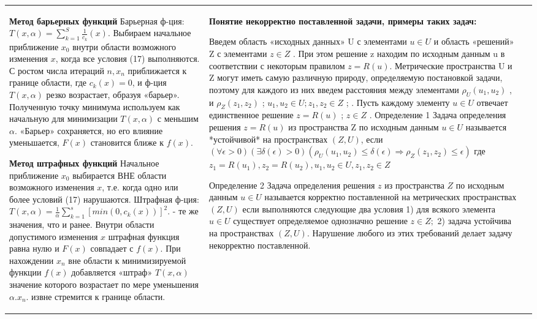 \documentclass[a4paper,2pt]{article}
\begin{document}
\begin{tabular}{|p{}|p{}|p{}|}
\textbf{Метод барьерных функций}
Барьерная ф-ция: \(T(x, \alpha) = \sum_{k=1}^{S}\frac{1}{c_{k}}(x)  \tag{19}\).
Выбираем начальное приближение \(x_{0}\) внутри области возможного изменения \(x\), когда все условия (17) выполняются. С ростом числа итераций \(n, x_{n}\) приближается к границе области, где \(c_{k}(x)=0\), и ф-ция \(T(x, \alpha)\) резко возрастает, образуя «барьер». Полученную точку минимума используем как начальную для минимизации \(T(x, \alpha)\) с меньшим \(\alpha\). «Барьер» сохраняется, но его влияние уменьшается, \(F(x)\) становится ближе к \(f(x)\).

\textbf{Метод штрафных функций}
Начальное приближение \(x_{0}\) выбирается ВНЕ области возможного изменения \(x\), т.е. когда одно или более условий (17) нарушаются. Штрафная ф-ция: \(T(x, \alpha) = \frac{1}{\alpha} \sum_{k=1}^{s}[min(0, c_{k}(x))]^2\). - те же значения, что и ранее. Внутри области допустимого изменения \(x\) штрафная функция равна нулю и \(F(x)\) совпадает с \(f(x)\). При нахождении \(x_{n}\) вне области к минимизируемой функции \(f(x)\) добавляется «штраф» \(T(x, \alpha)\) значение которого возрастает по мере уменьшения \(\alpha . x_{n}\). извне стремится к границе области.

&

\textbf{Понятие некорректно поставленной задачи, примеры таких задач:}

Введем область «исходных данных» U с элементами $u \in U$ и область «решений» Z с элементами $z \in Z$ . При этом решение z находим по исходным данным u в соответствии с некоторым правилом $z = R(u)$. Метрические пространства U и Z могут иметь самую различную природу, определяемую постановкой задачи, поэтому для каждого из них введем расстояния между элементами $\rho_U(u_1, u_2)$ , и $\rho_Z(z_1,z_2)$ ; $u_1, u_2 \in U ; z_1, z_2 \in Z$ ;  . Пусть каждому элементу $u \in U$ отвечает единственное решение $z=R(u)$ ; $z \in Z$ .
Определение 1
Задача определения решения $z=R(u)$ из пространства Z по исходным данным $u \in U$ называется *устойчивой* на пространствах $(Z, U)$, если
$(\forall\epsilon>0)(\exists\delta(\epsilon)>0)(\rho_U(u_1, u_2) \leq \delta(\epsilon) \Rightarrow \rho_Z(z_1, z_2)\leq\epsilon)$
где $z_1=R(u_1), z_2=R(u_2), u_1, u_2 \in U, z_1, z_2 \in Z$

Определение 2
Задача определения решения \(z\) из пространства \(Z\) по исходным данным $u\in U$ называется корректно поставленной на метрических пространствах $(Z,U)$ если выполняются следующие два условия
1) для всякого элемента $u \in U$ существует определяемое однозначно решение $z\in Z;$
2) задача устойчива на пространствах \((Z, U)\).
Нарушение любого из этих требований делает задачу некорректно поставленной.


\end{tabular}
\end{document}
